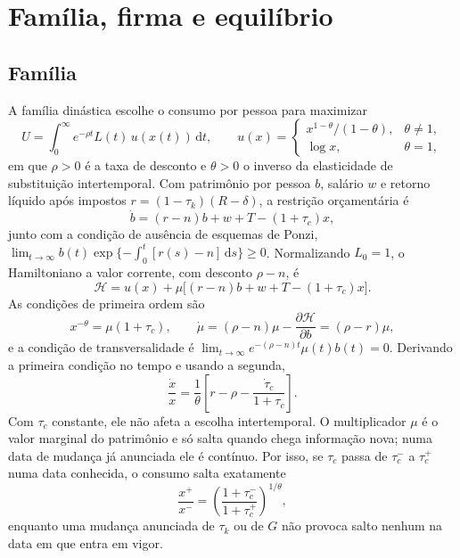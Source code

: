 \documentclass[11pt,a4paper]{article}
\newcommand{\dd}{\,\mathrm{d}}
\begin{document}
\section{Família, firma e equilíbrio}

\subsection{Família}
A família dinástica escolhe o consumo por pessoa para maximizar
\begin{equation}
 U=\int_0^\infty e^{-\rho t}L(t)\,u(x(t))\dd t,
 \qquad
 u(x)=\begin{cases}x^{1-\theta}/(1-\theta),&\theta\neq1,\\ \log x,&\theta=1,\end{cases}
 \label{eq:utilidade}
\end{equation}
em que $\rho>0$ é a taxa de desconto e $\theta>0$ o inverso da elasticidade de
substituição intertemporal. Com patrimônio por pessoa $b$, salário $w$ e
retorno líquido após impostos $r=(1-\tau_k)(R-\delta)$, a restrição
orçamentária é
\begin{equation}
 \dot b=(r-n)b+w+T-(1+\tau_c)x,
 \label{eq:orcamento}
\end{equation}
junto com a condição de ausência de esquemas de Ponzi,
$\lim_{t\to\infty}b(t)\exp\{-\int_0^t[r(s)-n]\dd s\}\ge0$.
Normalizando $L_0=1$, o Hamiltoniano a valor corrente, com desconto $\rho-n$, é
\[
 \mathcal H=u(x)+\mu\bigl[(r-n)b+w+T-(1+\tau_c)x\bigr].
\]
As condições de primeira ordem são
\begin{equation}
 x^{-\theta}=\mu(1+\tau_c),\qquad
 \dot\mu=(\rho-n)\mu-\frac{\partial\mathcal H}{\partial b}=(\rho-r)\mu,
 \label{eq:cpo}
\end{equation}
e a condição de transversalidade é
$\lim_{t\to\infty}e^{-(\rho-n)t}\mu(t)b(t)=0$. Derivando a primeira condição
no tempo e usando a segunda,
\begin{equation}
 \frac{\dot x}{x}=\frac1\theta\left[r-\rho-\frac{\dot\tau_c}{1+\tau_c}\right].
 \label{eq:euler}
\end{equation}
Com $\tau_c$ constante, ele não afeta a escolha intertemporal. O multiplicador
$\mu$ é o valor marginal do patrimônio e só salta quando chega informação
nova; numa data de mudança já anunciada ele é contínuo. Por isso, se $\tau_c$
passa de $\tau_c^-$ a $\tau_c^+$ numa data conhecida, o consumo salta
exatamente
\begin{equation}
 \frac{x^+}{x^-}=\left(\frac{1+\tau_c^-}{1+\tau_c^+}\right)^{1/\theta},
 \label{eq:salto}
\end{equation}
enquanto uma mudança anunciada de $\tau_k$ ou de $G$ não provoca salto nenhum
na data em que entra em vigor.
\end{document}
